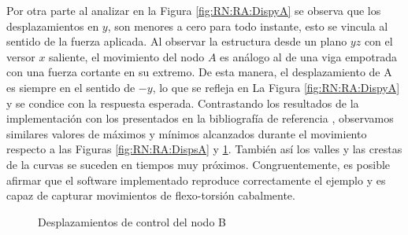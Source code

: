 Por otra parte al analizar en la Figura \ref{fig:RN:RA:DispyA} se observa que los desplazamientos en $y$, son menores a cero para todo instante, esto se vincula al sentido de la fuerza aplicada. Al observar la estructura desde un plano $yz$ con el versor $x$ saliente, el movimiento del nodo $A$ es análogo al de una viga empotrada con una fuerza cortante en su extremo. De esta manera, el desplazamiento de A es siempre en el sentido de $-y$, lo que se refleja en La Figura \ref{fig:RN:RA:DispyA} y se condice con la respuesta esperada. Contrastando los resultados de la implementación con los presentados en la bibliografía de referencia \textcite{Le2014}, observamos similares valores de máximos y mínimos alcanzados durante el movimiento respecto a las Figuras \ref{fig:RN:RA:DispsA} y \ref{fig:RN:RA:DispsB}. También así los valles y las crestas de la curvas se suceden en tiempos muy próximos. Congruentemente, es posible afirmar que el software implementado reproduce correctamente el ejemplo y es capaz de capturar movimientos de flexo-torsión cabalmente. 


\begingroup
\centering
\begin{figure}[htbp]
	\centering
	\label{fig:RN:RA:DispyB}
	\label{fig:RN:RA:DispzB}
	\caption{Desplazamientos de control del nodo B} \label{fig:RN:RA:DispsB}
\end{figure}
\endgroup

